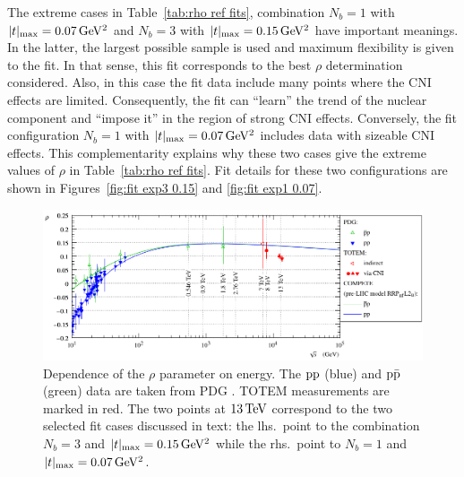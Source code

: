 The extreme cases in Table~\ref{tab:rho ref fits}, combination $N_b=1$ with $|t|_{\rm max} = 0.07\,{\rm GeV^2}$ and $N_b=3$ with $|t|_{\rm max} = 0.15\,{\rm GeV^2}$ have important meanings. In the latter, the largest possible sample is used and maximum flexibility is given to the fit. In that sense, this fit corresponds to the best $\rho$ determination considered. Also, in this case the fit data include many points where the CNI effects are limited. Consequently, the fit can ``learn'' the trend of the nuclear component and ``impose it'' in the region of strong CNI effects. Conversely, the fit configuration $N_b=1$ with $|t|_{\rm max} = 0.07\,{\rm GeV^2}$ includes data with sizeable CNI effects. This complementarity explains why these two cases give the extreme values of $\rho$ in Table~\ref{tab:rho ref fits}. Fit details for these two configurations are shown in Figures~\ref{fig:fit exp3 0.15} and \ref{fig:fit exp1 0.07}.

\begin{figure}
\begin{center}
\includegraphics{fig/rho_vs_s.pdf}
\caption{%
Dependence of the $\rho$ parameter on energy. The $\rm pp$ (blue) and $\rm p\bar p$ (green) data are taken from PDG \cite{pdg-2010}. TOTEM measurements are marked in red. The two points at $13\,{\rm TeV}$ correspond to the two selected fit cases discussed in text: the lhs.~point to the combination $N_b = 3$ and $|t|_{\rm max} = 0.15\,{\rm GeV^2}$ while the rhs.~point to $N_b = 1$ and $|t|_{\rm max} = 0.07\,{\rm GeV^2}$.
}
\label{fig:rho_vs_s}
\end{center}
\vskip-5mm
\end{figure}

